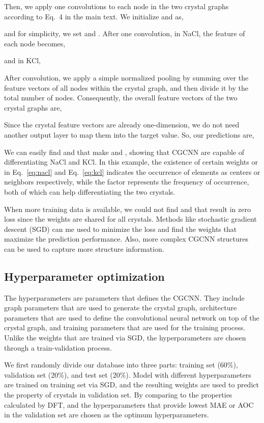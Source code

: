 \documentclass[twocolumn, prl]{revtex4-1}
\begin{document}
Then, we apply one convolutions to each node in the two crystal graphs according to Eq.~4 in the main text. We initialize  and  as,

and for simplicity, we set  and . After one convolution, in NaCl, the feature of each node becomes,

and in KCl,


After convolution, we apply a simple normalized pooling by summing over the feature vectors of all nodes  within the crystal graph, and then divide it by the total number of nodes. Consequently, the overall feature vectors of the two crystal graphs are,


Since the crystal feature vectors are already one-dimension, we do not need another output layer to map them into the target value. So, our predictions are,


We can easily find  and  that make  and , showing that CGCNN are capable of differentiating NaCl and KCl. In this example, the existence of certain weights  or  in Eq.~\ref{eq:nacl} and Eq.~\ref{eq:kcl} indicates the occurrence of elements as centers or neighbors respectively, while the factor represents the frequency of occurrence, both of which can help differentiating the two crystals.

When more training data is available, we could not find  and  that result in zero loss since the weights are shared for all crystals. Methods like stochastic gradient descent (SGD) can me used to minimize the loss and find the weights that maximize the prediction performance. Also, more complex CGCNN structures can be used to capture more structure information.


\subsection{Hyperparameter optimization}\label{sec:hyper}

The hyperparameters are parameters that defines the CGCNN. They include graph parameters that are used to generate the crystal graph, architecture parameters that are used to define the convolutional neural network on top of the crystal graph, and training parameters that are used for the training process. Unlike the weights that are trained via SGD, the hyperparameters are chosen through a train-validation process.

We first randomly divide our database into three parts: training set (60\%), validation set (20\%), and test set (20\%). Model with different hyperparameters are trained on training set via SGD, and the resulting weights are used to predict the property of crystals in validation set. By comparing to the properties calculated by DFT, and the hyperparameters that provide lowest MAE or AOC in the validation set are chosen as the optimum hyperparameters.
\end{document}
